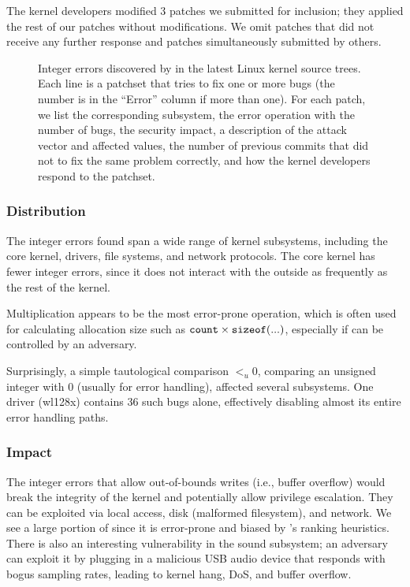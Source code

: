 The kernel developers modified 3 patches we submitted for inclusion;
they applied the rest of our patches without modifications.
%
We omit \nrbugsnoresp patches that did not receive any further response
and \nrbugsbyothers patches simultaneously submitted by others.

\begin{figure*}
\centering
\footnotesize

\caption{Integer errors discovered by \sys in the latest Linux
kernel source trees.  Each line is a patchset that tries to fix one
or more bugs (the number is in the ``Error'' column if more than
one).  For each patch, we list the corresponding subsystem, the
error operation with the number of bugs, the security impact, a
description of the attack vector and affected values, the number
of previous commits that did not to fix the same problem correctly,
and how the kernel developers respond to the patchset.}
\label{f:data:linux}
\end{figure*}

\subsubsection{Distribution}

The integer errors \sys found span a wide range of kernel subsystems,
including the core kernel, drivers, file systems, and network protocols.
The core kernel has fewer integer errors, since it does not
interact with the outside as frequently as the rest of the kernel.

Multiplication appears to be the most error-prone operation, which
is often used for calculating allocation size such as $\texttt{count}
\times \texttt{sizeof}(...)$, especially if  can be controlled
by an adversary.

Surprisingly,  a simple tautological comparison $<_u 0$,
comparing an unsigned integer with 0 (usually for error handling),
affected several subsystems.
One driver (wl128x) contains 36 such bugs alone, effectively
disabling almost its entire error handling paths.

\subsubsection{Impact}

The integer errors that allow out-of-bounds writes (i.e., buffer
overflow) would break the integrity of the kernel and potentially
allow privilege escalation.  They can be exploited via local access,
disk (malformed filesystem), and network.  We see a large portion
of  since it is error-prone and biased by \sys's ranking
heuristics.
%
There is also an interesting vulnerability in the sound subsystem;
an adversary can exploit it by plugging in a malicious USB audio
device that responds with bogus sampling rates, leading to kernel
hang, DoS, and buffer overflow.

